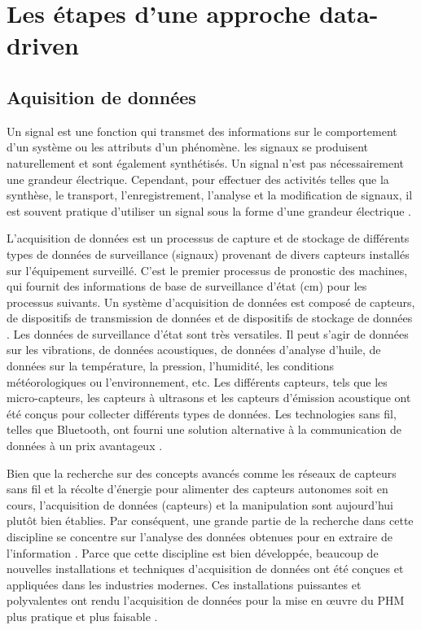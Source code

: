 \chapter{Les étapes d'une approche data-driven}

\section{Aquisition de données}
Un signal est une fonction qui transmet des informations sur le comportement d'un système ou les attributs d'un phénomène. les signaux se produisent naturellement et sont également synthétisés. Un signal n'est pas nécessairement une grandeur électrique. Cependant, pour effectuer des activités telles que la synthèse, le transport, l'enregistrement, l'analyse et la modification de signaux, il est souvent pratique d'utiliser un signal sous la forme d'une grandeur électrique \cite{Priemer1990}.

L'acquisition de données est un processus de capture et de stockage de différents types de données de surveillance (signaux) provenant de divers capteurs installés sur l'équipement surveillé. C'est le premier processus de pronostic des machines, qui fournit des informations de base de surveillance d'état (\acrlong{cm}) pour les processus suivants. Un système d'acquisition de données est composé de capteurs, de dispositifs de transmission de données et de dispositifs de stockage de données \cite{Lei2018}. Les données de surveillance d'état sont très versatiles. Il peut s'agir de données sur les vibrations, de données acoustiques, de données d'analyse d'huile, de données sur la température, la pression, l'humidité, les conditions météorologiques ou l'environnement, etc. Les différents capteurs, tels que les micro-capteurs, les capteurs à ultrasons et les capteurs d'émission acoustique ont été conçus pour collecter différents types de données. Les technologies sans fil, telles que Bluetooth, ont fourni une solution alternative à la communication de données à un prix avantageux \cite{Jardine2006}.

Bien que la recherche sur des concepts avancés comme les réseaux de capteurs sans fil et la récolte d’énergie pour alimenter des capteurs autonomes soit en cours, l’acquisition de données (capteurs) et la manipulation sont aujourd’hui plutôt bien établies. Par conséquent, une grande partie de la recherche dans cette discipline se concentre sur l’analyse des données obtenues pour en extraire de l’information \cite{Tinga2014}. Parce que cette discipline est bien développée, beaucoup de nouvelles installations et techniques d’acquisition de données ont été conçues et appliquées dans les industries modernes. Ces installations puissantes et polyvalentes ont rendu l’acquisition de données pour la mise en œuvre du PHM plus pratique et plus faisable \cite{Lei2016}.

